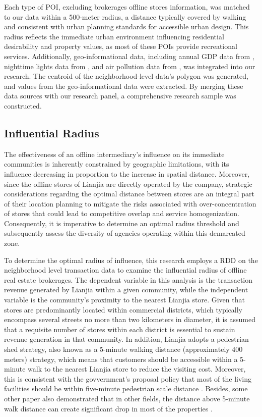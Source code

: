 \documentclass[11pt]{article}
\begin{document}
Each type of POI, excluding brokerages offline stores information, was matched to our data within a 500-meter radius, a distance typically covered by walking and consistent with urban planning standards for accessible urban design. This radius reflects the immediate urban environment influencing residential desirability and property values, as most of these POIs provide recreational services. Additionally, geo-informational data, including annual GDP data from \citet{zhao_forecasting_2017}, nighttime lights data from \citet{elvidge_annual_2021}, and air pollution data from \citet{doi:10.1021/acs.est.1c05309}, was integrated into our research. The centroid of the neighborhood-level data's polygon was generated, and values from the geo-informational data were extracted. By merging these data sources with our research panel, a comprehensive research sample was constructed.

\subsection{Influential Radius} \label{subsec:Influential_Radius}

The effectiveness of an offline intermediary's influence on its immediate communities is inherently constrained by geographic limitations, with its influence decreasing in proportion to the increase in spatial distance. Moreover, since the offline stores of Lianjia are directly operated by the company, strategic considerations regarding the optimal distance between stores are an integral part of their location planning to mitigate the risks associated with over-concentration of stores that could lead to competitive overlap and service homogenization. Consequently, it is imperative to determine an optimal radius threshold and subsequently assess the diversity of agencies operating within this demarcated zone.

To determine the optimal radius of influence, this research employs a RDD on the neighborhood level transaction data to examine the influential radius of offline real estate brokerages. The dependent variable in this analysis is the transaction revenue generated by Lianjia within a given community, while the independent variable is the community's proximity to the nearest Lianjia store. Given that stores are predominantly located within commercial districts, which typically encompass several streets no more than two kilometers in diameter, it is assumed that a requisite number of stores within each district is essential to sustain revenue generation in that community. In addition, Lianjia adopts a pedestrian shed strategy, also known as a 5-minute walking distance (approximately 400 meters) strategy, which means that customers should be accessible within a 5-minute walk to the nearest Lianjia store to reduce the visiting cost. Moreover, this is consistent with the govvernment's proposal policy that most of the living facilities should be within five-minute pedestrian scale distance \citep{GB50180-2018}. Besides, some other paper also demonstrated that in other fields, the distance above 5-minute walk distance can create significant drop in most of the properties \citep{liu2023chrono-urbanism}.
\end{document}
